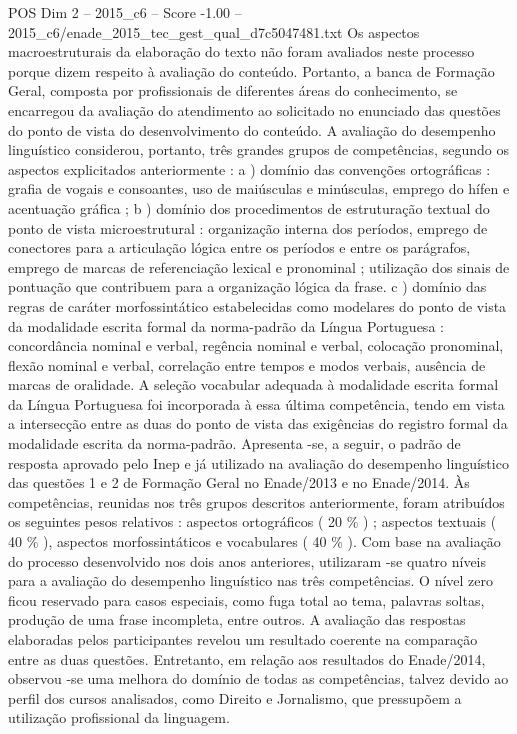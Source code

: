 \begin{textsample}{POS Dim 2 – 2015\_c6 – Score -1.00 – 2015\_c6/enade\_2015\_tec\_gest\_qual\_d7c5047481.txt}
Os aspectos macroestruturais da elaboração do texto não foram avaliados neste processo porque dizem respeito à avaliação do conteúdo.
Portanto, a banca de Formação Geral, composta por profissionais de diferentes áreas do conhecimento, se encarregou da avaliação do atendimento ao solicitado no enunciado das questões do ponto de vista do desenvolvimento do conteúdo.
A avaliação do desempenho linguístico considerou, portanto, três grandes grupos de competências, segundo os aspectos explicitados anteriormente : a ) domínio das convenções ortográficas : grafia de vogais e consoantes, uso de maiúsculas e minúsculas, emprego do hífen e acentuação gráfica ; b ) domínio dos procedimentos de estruturação textual do ponto de vista microestrutural : organização interna dos períodos, emprego de conectores para a articulação lógica entre os períodos e entre os parágrafos, emprego de marcas de referenciação lexical e pronominal ; utilização dos sinais de pontuação que contribuem para a organização lógica da frase. c ) domínio das regras de caráter morfossintático estabelecidas como modelares do ponto de vista da modalidade escrita formal da norma-padrão da Língua Portuguesa : concordância nominal e verbal, regência nominal e verbal, colocação pronominal, flexão nominal e verbal, correlação entre tempos e modos verbais, ausência de marcas de oralidade.
A seleção vocabular adequada à modalidade escrita formal da Língua Portuguesa foi incorporada à essa última competência, tendo em vista a intersecção entre as duas do ponto de vista das exigências do registro formal da modalidade escrita da norma-padrão.
Apresenta -se, a seguir, o padrão de resposta aprovado pelo Inep e já utilizado na avaliação do desempenho linguístico das questões 1 e 2 de Formação Geral no Enade/2013 e no Enade/2014.
Às competências, reunidas nos três grupos descritos anteriormente, foram atribuídos os seguintes pesos relativos : aspectos ortográficos ( 20 \% ) ; aspectos textuais ( 40 \% ), aspectos morfossintáticos e vocabulares ( 40 \% ).
Com base na avaliação do processo desenvolvido nos dois anos anteriores, utilizaram -se quatro níveis para a avaliação do desempenho linguístico nas três competências.
O nível zero ficou reservado para casos especiais, como fuga total ao tema, palavras soltas, produção de uma frase incompleta, entre outros.
A avaliação das respostas elaboradas pelos participantes revelou um resultado coerente na comparação entre as duas questões.
Entretanto, em relação aos resultados do Enade/2014, observou -se uma melhora do domínio de todas as competências, talvez devido ao perfil dos cursos analisados, como Direito e Jornalismo, que pressupõem a utilização profissional da linguagem.

\end{textsample}
